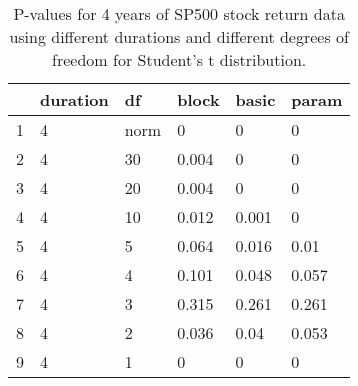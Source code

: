 \begin{table}[ht]
\centering
\caption{P-values for 4 years of SP500 stock return 
                   data using different durations
  and different degrees of freedom for Student's t distribution.} 
\label{table:SP5004}
\begin{tabular}{rlllll}
  \hline
 & duration & df & block & basic & param \\ 
  \hline
1 & 4 & norm & 0 & 0 & 0 \\ 
  2 & 4 & 30 & 0.004 & 0 & 0 \\ 
  3 & 4 & 20 & 0.004 & 0 & 0 \\ 
  4 & 4 & 10 & 0.012 & 0.001 & 0 \\ 
  5 & 4 & 5 & 0.064 & 0.016 & 0.01 \\ 
  6 & 4 & 4 & 0.101 & 0.048 & 0.057 \\ 
  7 & 4 & 3 & 0.315 & 0.261 & 0.261 \\ 
  8 & 4 & 2 & 0.036 & 0.04 & 0.053 \\ 
  9 & 4 & 1 & 0 & 0 & 0 \\ 
   \hline
\end{tabular}
\end{table}


